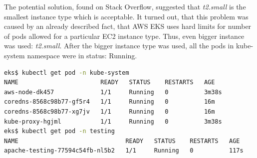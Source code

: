 The potential solution, found on Stack Overflow, suggested that \textit{t2.small} is the smallest instance type which is acceptable\cite{eks-instance-problem-so}. It turned out, that this problem was caused by an already described fact, that AWS EKS uses hard limits for number of pods allowed for a particular EC2 instance type\cite{eks-hard-limits}. Thus, even bigger instance was used: \textit{t2.small}. After the bigger instance type was used, all the pods in kube-system namespace were in status: Running.
\begin{lstlisting}[basicstyle=\tiny,caption={Verifying that all the pods are running},captionpos=b,language=Bash,xleftmargin=1cm]
eks$ kubectl get pod -n kube-system
NAME                       READY   STATUS    RESTARTS   AGE
aws-node-dk457             1/1     Running   0          3m38s
coredns-8568c98b77-gf5r4   1/1     Running   0          16m
coredns-8568c98b77-xg7jv   1/1     Running   0          16m
kube-proxy-hgjml           1/1     Running   0          3m38s
eks$ kubectl get pod -n testing
NAME                              READY   STATUS    RESTARTS   AGE
apache-testing-77594c54fb-nl5b2   1/1     Running   0          117s
\end{lstlisting}

